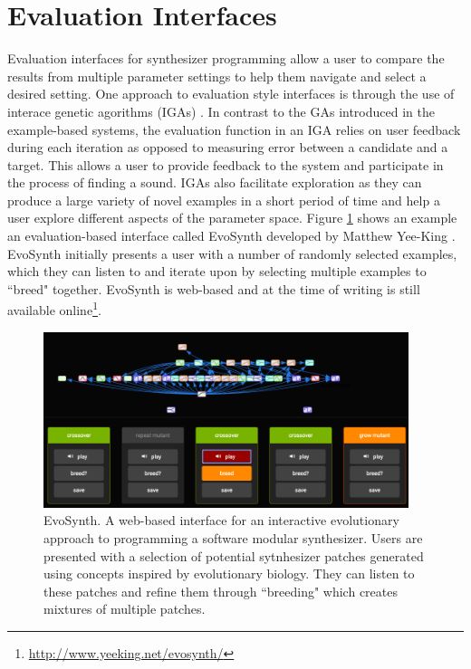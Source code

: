 \section{Evaluation Interfaces}
Evaluation interfaces for synthesizer programming allow a user to compare the results from multiple parameter settings to help them navigate and select a desired setting. One approach to evaluation style interfaces is through the use of interace genetic agorithms (IGAs) \cite{johnson1999exploring, dahlstedt2001creating, yee2016use}. In contrast to the GAs introduced in the example-based systems, the evaluation function in an IGA relies on user feedback during each iteration as opposed to measuring error between a candidate and a target. This allows a user to provide feedback to the system and participate in the process of finding a sound. IGAs also facilitate exploration as they can produce a large variety of novel examples in a short period of time and help a user explore different aspects of the parameter space. Figure \ref{fig:evosynth} shows an example an evaluation-based interface called EvoSynth developed by Matthew Yee-King \cite{yee2016use}. EvoSynth initially presents a user with a number of randomly selected examples, which they can listen to and iterate upon by selecting multiple examples to ``breed" together. EvoSynth is web-based and at the time of writing is still available online\footnote{\url{http://www.yeeking.net/evosynth/}}.

\begin{figure}[ht]
    \centering
    \includegraphics[width=0.95\textwidth]{figures/background/EvoSynth.png}
    \caption{EvoSynth. A web-based interface for an interactive evolutionary approach to programming a software modular synthesizer. Users are presented with a selection of potential sytnhesizer patches generated using concepts inspired by evolutionary biology. They can listen to these patches and refine them through ``breeding" which creates mixtures of multiple patches.}
    \label{fig:evosynth}
\end{figure}

